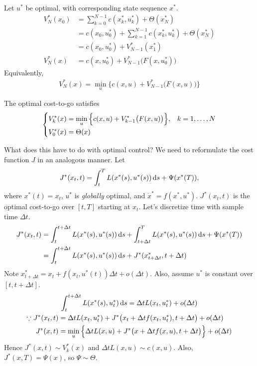 \clearpage
\begin{framed}
  \begin{defi}
    Let $u^*$ be optimal, with corresponding state sequence $x^*$.
    \begin{align}
      V^*_N(x_0) &= \sum_{k=0}^{N-1} c(x_k^*,u_k^*) + \Theta(x_N^*) \\
      &= c(x_0,u^*_0) + \sum_{k=1}^{N-1} c(x_k^*,u_k^*) + \Theta(x_N^*) \\
      &= c(x_0,u^*_0) + V^*_{N-1}(x_1^*) \\
      V^*_N(x) &= c(x,u^*_0) + V^*_{N-1}\big(F(x,u_0^*)\big)
    \end{align}
    Equivalently,
    \begin{gather}
      V^*_N(x) = \min_u \Big\{ c(x,u) + V^*_{N-1}\big(F(x,u)\big) \Big\}
    \end{gather}
  \end{defi}
\end{framed}

\begin{thm}
  The optimal cost-to-go satisfies
  \begin{gather}
    \begin{dcases}
      V^*_k(x) = \min_u \Big\{ c(x,u) + V^*_{k-1}\big(F(x,u)\big) \Big\}, & k=1,\dots,N \\
      V^*_0(x) = \Theta(x)
    \end{dcases}
  \end{gather}
\end{thm}

What does this have to do with optimal control? We need to reformulate the cost function $J$ in an analogous manner. Let
\begin{gather}
  J^*(x_t,t) = \int_t^T L(x^*(s),u^*(s))\mathop{}\!\mathrm{d} s + \Psi(x^*(T)),
\end{gather}
where $x^*(t)=x_t$, $u^*$ is \emph{globally} optimal, and $\dot x^*=f(x^*,u^*)$. $J^*(x_t,t)$ is the optimal cost-to-go over $[t,T]$ starting at $x_t$. Let's discretize time with sample time $\Delta t$.
\begin{align}
  J^*(x_t,t) &= \int_t^{t+\Delta t} L(x^*(s),u^*(s))\mathop{}\!\mathrm{d} s + \int_{t+\Delta t}^T L(x^*(s),u^*(s))\mathop{}\!\mathrm{d} s + \Psi(x^*(T)) \\
  &= \int_t^{t+\Delta t} L(x^*(s),u^*(s))\mathop{}\!\mathrm{d} s + J^*(x^*_{t+\Delta t},t+\Delta t)
\end{align}
Note $x^*_{t+\Delta t}=x_t + f(x_t,u^*(t))\Delta t + o(\Delta t)$. Also, assume $u^*$ is constant over $[t,t+\Delta t]$.
\begin{gather}
  \int_t^{t+\Delta t} L(x^*(s),u^*_t)\mathop{}\!\mathrm{d} s = \Delta t L(x_t,u^*_t) + o(\Delta t) \\
  \begin{aligned}
    \because J^*(x_t,t) &= \Delta t L(x_t,u^*_t) + J^*\big(x_t+\Delta t f(x_t,u^*_t),t+\Delta t\big) + o(\Delta t) \\
    J^*(x,t) &= \min_u \Big\{ \Delta t L(x,u) + J^*\big(x+\Delta t f(x,u),t+\Delta t\big) \Big\} + o(\Delta t)
  \end{aligned}
\end{gather}
Hence $J^*(x,t)\sim V_k^*(x)$ and $\Delta tL(x,u)\sim c(x,u)$. Also, $J^*(x,T)=\Psi(x)$, so $\Psi\sim\Theta$.

